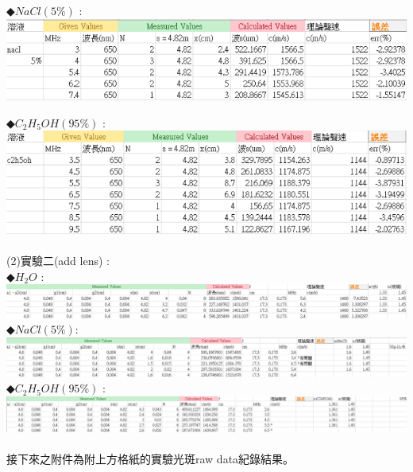 \documentclass[UTF8]{ctexart}
\begin{document}
\begin{CJK*}{UTF8}{song}
◆$NaCl (5\%)$ : \\
\includegraphics[width = 1.0\textwidth]{EXP1_NACL.png} \\

\newpage %

◆$C_{2}H_{5}OH (95\%)$ : \\
\includegraphics[width = 1.0\textwidth]{EXP1_C2H5OH.png} \\
\\

(2)實驗二(add lens) : \\
◆$H_{2}O$ : \\
\includegraphics[width = 1.0\textwidth]{EXP2_LENS_H2O.png} \\

◆$NaCl (5\%)$: \\
\includegraphics[width = 1.0\textwidth]{EXP2_LENS_NACL.png} \\

◆$C_{2}H_{5}OH (95\%)$ : \\
\includegraphics[width = 1.0\textwidth]{EXP2_LENS_C2H5OH.png} \\
\\

接下來之附件為附上方格紙的實驗光斑raw data紀錄結果。

\newpage




\end{CJK*}
\end{document}
